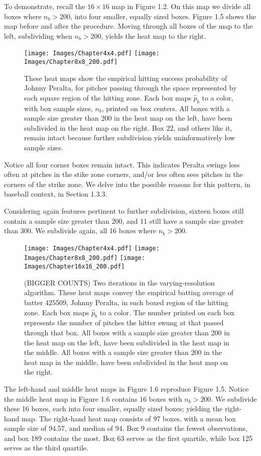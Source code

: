 To demonstrate, recall the $16 \times 16$ map in Figure 1.2. On this map we divide all boxes where $n_{b} > 200$, into four smaller, equally sized boxes. Figure 1.5 shows the map before and after the procedure. Moving through all boxes of the map to the left, subdividing when $n_{b} > 200$, yields the heat map to the right.
        \begin{figure}[H]
      	\centering
      	\texttt{[image: Images/Chapter4x4.pdf]} 
      	\texttt{[image: Images/Chapter8x8\_200.pdf]} 
      	\caption{These heat maps show the empirical hitting success probability of Johnny Peralta, for pitches passing through the space represented by each square region of the hitting zone.  Each box maps $\hat{p}_{b}$ to a color, with box sample sizes, $n_{b}$, printed on box centers. All boxes with a sample size greater than 200 in the heat map on the left, have been subdivided in the heat map on the right. Box 22, and others like it, remain intact because further subdivision yields uninformatively low sample sizes.}
      	\end{figure} 
      	
Notice all four corner boxes remain intact. This indicates Peralta  swings less often at pitches in the stike zone corners, and/or less often sees pitches in the corners of the strike zone. We delve into the possible reasons for this pattern, in baseball context, in Section 1.3.3.

Considering again features pertinent to further subdivision, sixteen boxes still contain a sample size greater than 200, and 11 still have a sample size greater than 300. We subdivide again, all 16 boxes where $n_{b} > 200$.
        \begin{figure}[H]
      	\centering
      	\texttt{[image: Images/Chapter4x4.pdf]}
      	\texttt{[image: Images/Chapter8x8\_200.pdf]} 
      	\texttt{[image: Images/Chapter16x16\_200.pdf]} 
      	\caption{(BIGGER COUNTS) Two iterations in the varying-resolution algorithm. These heat maps convey the empirical batting average of batter 425509, Johnny Peralta, in each boxed region of the hitting zone. Each box maps $\hat{p}_{b}$ to a color. The number printed on each box represents the number of pitches the hitter swung at that passed through that box. All boxes with a sample size greater than 200 in the heat map on the left, have been subdivided in the heat map in the middle. All boxes with a sample size greater than 200 in the heat map in the middle, have been subdivided in the heat map on the right.}
      	\end{figure}
The left-hand and middle heat maps in Figure 1.6 reproduce Figure 1.5. Notice the middle heat map in Figure 1.6 contains 16 boxes with $n_{b} > 200$. We subdivide these 16 boxes, each into four smaller, equally sized boxes; yielding the right-hand map. The right-hand heat map consists of 97 boxes, with a mean box sample size of 94.57, and median of 94. Box 9 contains the fewest observations, and box 189 contains the most. Box 63 serves as the first quartile, while box 125 serves as the third quartile. 

